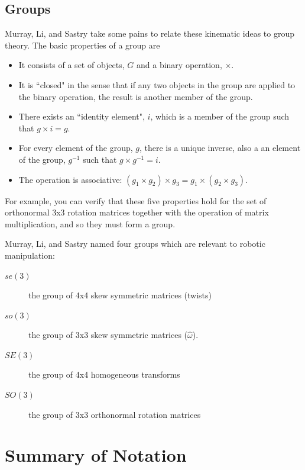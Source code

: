 \subsection{Groups}
Murray, Li, and Sastry take some pains to relate these kinematic ideas to group theory.
The basic properties of a group are
\begin{itemize}
        \item It consists of a set of objects, $G$ and a binary operation, $\times$.
        \item It is ``closed" in the sense that if any two objects in the
        group are applied to the binary operation, the result is another member
        of the group.
        \item There exists an ``identity element", $i$, which is a member of the
        group such that $g \times i = g$.
        \item For every element of the group, $g$, there is a unique inverse, also a
        an element of the group, $g^{-1}$
         such that $g\times g^{-1} = i$.
        \item The operation is associative:  $(g_1\times g_2)\times g_3= g_1 \times (g_2\times g_3)$.
\end{itemize}
For example, you can verify that these five properties hold for the set of orthonormal 3x3 rotation matrices together with
the operation of matrix multiplication, and so they must form a group.

Murray, Li, and Sastry named four groups which are relevant to robotic manipulation:
\begin{description}
        \item[$se(3)$] the group of 4x4 skew symmetric matrices (twists)
        \item[$so(3)$] the group of 3x3 skew symmetric matrices ($\hat{\omega}$).
        \item[$SE(3)$] the group of 4x4 homogeneous transforms
        \item[$SO(3)$] the group of 3x3 orthonormal rotation matrices
\end{description}


\section{Summary of Notation}


